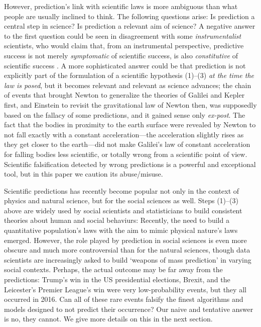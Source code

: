 \documentclass{statsoc}
\begin{document}
However, prediction's link with scientific laws is  more ambiguous than what people are usually inclined to think. The following questions arise: Is prediction a central step in science? 
Is prediction a relevant aim of science? 
A negative answer to the first question could be seen in disagreement with some 
\emph{instrumentalist} scientists, who would claim that, from an instrumental perspective, predictive success is not merely \emph{symptomatic} of scientific success, is also 
\emph{constitutive} of scientific success \citep{hitchcock2004prediction}. A more sophisticated answer could be  that prediction is not explicitly part of the formulation of a 
scientific hypothesis (1)--(3) \emph{at the time the law is posed}, but it becomes relevant and relevant as science advances; the chain of events that brought Newton to 
generalize the theories of Galilei and Kepler first, and Einstein to revisit the gravitational law of Newton then, was supposedly based on the fallacy of some predictions, and it gained sense 
only \emph{ex-post}. The fact that the bodies in proximity to the earth surface were revealed by Newton to not fall exactly with a constant acceleration---the acceleration slightly 
rises as they get closer to the earth---did not make Galilei's law of constant acceleration for falling bodies less scientific, or totally wrong from a scientific point of view. Scientific falsification detected by wrong predictions \citep{popper1934logic} is a powerful and exceptional tool, but in this paper we caution  its abuse/misuse. 

Scientific predictions has recently become popular not only in the context of physics and natural science, but for the social sciences as well. Steps (1)--(3) above are widely used by social scientists and statisticians to build consistent theories about human and social behaviurs: Recently, the need to build a quantitative population's laws with the aim to mimic physical nature's laws emerged.  However, the role played by 
prediction in social sciences is even more obscure \citep{popper1944poverty, popper1945poverty} and much more controversial than for the natural sciences, though data scientists are increasingly asked to build 
`weapons of mass prediction' in varying social contexts. 
Perhaps, the actual outcome may be far away from the predictions: Trump's win in the US 
presidential elections, Brexit, and the Leicester's Premier League's win were very low-probability events, but they all occurred in 2016. Can all of these rare events falsify the finest algorithms and models designed to not predict their occurrence? Our naive and tentative answer is no, they cannot. We give more details on this in the next section.
\end{document}
